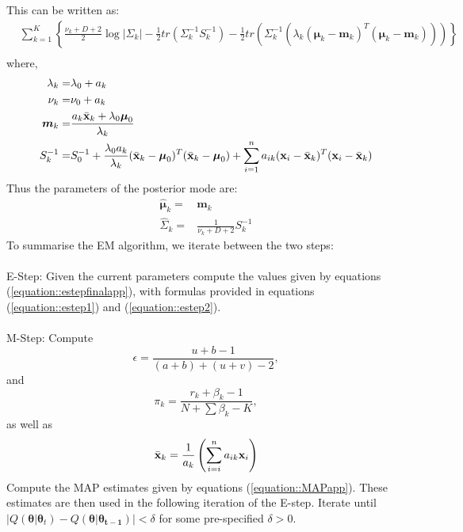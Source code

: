 \documentclass[12pt,english]{article}\usepackage[]{graphicx}\usepackage[]{color}
\begin{document}
This can be written as:
\begin{equation}\label{equation::MobjFinal}
\begin{split}
&\sum_{k=1}^{K} \left\{\frac{\nu_k + D + 2}{2} \log|\Sigma_k|  - \frac{1}{2} tr \left(\Sigma_{k}^{-1} S_k^{-1}\right)-\frac{1}{2} tr \left( \Sigma_{k}^{-1}\left(\lambda_k(\boldsymbol{\mu}_k - \boldsymbol{m}_k)^T(\boldsymbol{\mu}_k - \boldsymbol{m}_k)\right)\right)\right\} \\
\end{split}
\end{equation}
where,
\begin{equation}\label{equation::Posterior}
\begin{split}
\lambda_k = &\lambda_0 + a_k \\
\nu_k = & \nu_0 + a_k \\
\boldsymbol{m}_k = & \frac{a_k\bar{{\bf x}}_k + \lambda_0\boldsymbol{\mu}_0}{\lambda_k}\\
S_k^{-1}  = & S_0^{-1} + \frac{\lambda_0 a_k}{\lambda_k}(\bar{{\bf x}}_k - \boldsymbol{\mu}_0)^{T} (\bar{{\bf x}}_k - \boldsymbol{\mu}_0) + \sum_{i=1}^{n} a_{ik}({\bf x}_i -\bar{{\bf x}}_k)^{T}({\bf x}_i -\bar{{\bf x}}_k)
\end{split}
\end{equation}
Thus the parameters of the posterior mode are:
\begin{equation}\label{equation::MAPapp}
\begin{split}
\boldsymbol{\hat{\mu}}_k = &\boldsymbol{m}_k \\
\hat{\Sigma}_k = & \frac{1}{\nu_k + D + 2}S_k^{-1}
\end{split}
\end{equation}
To summarise the EM algorithm, we iterate between the two steps:
\\
\\
E-Step: Given the current parameters compute the values given by equations (\ref{equation::estepfinalapp}), with formulas provided in equations (\ref{equation::estep1}) and (\ref{equation::estep2}).
\\
\\
M-Step:
Compute
\[\epsilon = \frac{ u + b - 1}{(a+b) + (u+v) - 2},\]
and
\[\pi_k = \frac{r_k + \beta_k - 1}{N + \sum \beta_k - K},\]
as well as
\[\bar{{\bf x}}_k = \frac{1}{a_k}\left(\sum_{i=i}^{n}a_{ik}{\bf x}_i\right)\]
Compute the MAP estimates given by equations (\ref{equation::MAPapp}). These estimates are then used in the following iteration of the E-step. Iterate until $\lvert Q(\boldsymbol{\theta}|\boldsymbol{\theta}_{t}) - Q(\boldsymbol{\theta}|\boldsymbol{\theta_{t-1}})\rvert < \delta$ for some pre-specified $\delta >0$.
\end{document}
